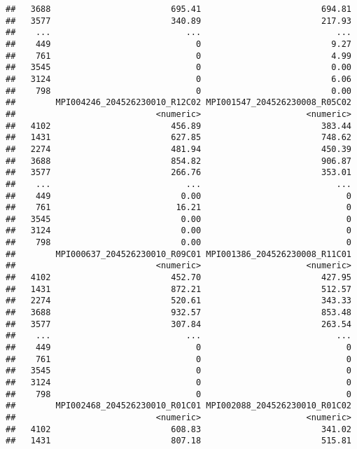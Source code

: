 \documentclass[
]{article}
\begin{document}
\begin{verbatim}
##   3688                        695.41                        694.81
##   3577                        340.89                        217.93
##    ...                           ...                           ...
##    449                             0                          9.27
##    761                             0                          4.99
##   3545                             0                          0.00
##   3124                             0                          6.06
##    798                             0                          0.00
##        MPI004246_204526230010_R12C02 MPI001547_204526230008_R05C02
##                            <numeric>                     <numeric>
##   4102                        456.89                        383.44
##   1431                        627.85                        748.62
##   2274                        481.94                        450.39
##   3688                        854.82                        906.87
##   3577                        266.76                        353.01
##    ...                           ...                           ...
##    449                          0.00                             0
##    761                         16.21                             0
##   3545                          0.00                             0
##   3124                          0.00                             0
##    798                          0.00                             0
##        MPI000637_204526230010_R09C01 MPI001386_204526230008_R11C01
##                            <numeric>                     <numeric>
##   4102                        452.70                        427.95
##   1431                        872.21                        512.57
##   2274                        520.61                        343.33
##   3688                        932.57                        853.48
##   3577                        307.84                        263.54
##    ...                           ...                           ...
##    449                             0                             0
##    761                             0                             0
##   3545                             0                             0
##   3124                             0                             0
##    798                             0                             0
##        MPI002468_204526230010_R01C01 MPI002088_204526230010_R01C02
##                            <numeric>                     <numeric>
##   4102                        608.83                        341.02
##   1431                        807.18                        515.81

\end{verbatim}
\end{document}

